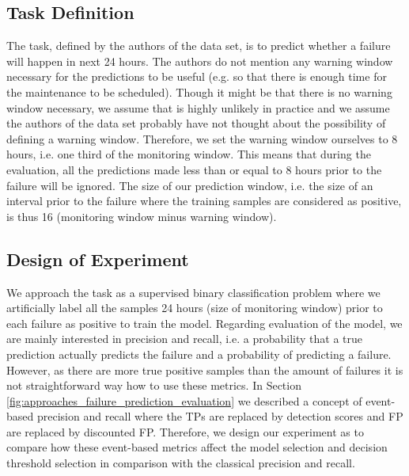 \subsection{Task Definition}

The task, defined by the authors of the data set, is to predict whether a failure will happen in next 24 hours.
The authors do not mention any warning window necessary for the predictions to be useful (e.g. so that there is enough time for the maintenance to be scheduled).
Though it might be that there is no warning window necessary, we assume that is highly unlikely in practice and we assume the authors of the data set probably have not thought about the possibility of defining a warning window.
Therefore, we set the warning window ourselves to 8 hours, i.e. one third of the monitoring window.
This means that during the evaluation, all the predictions made less than or equal to 8 hours prior to the failure will be ignored.
The size of our prediction window, i.e. the size of an interval prior to the failure where the training samples are considered as positive, is thus 16 (monitoring window minus warning window).

\subsection{Design of Experiment}

We approach the task as a supervised binary classification problem where we artificially label all the samples 24 hours (size of monitoring window) prior to each failure as positive to train the model.
Regarding evaluation of the model, we are mainly interested in precision and recall, i.e. a probability that a true prediction actually predicts the failure and a probability of predicting a failure.
However, as there are more true positive samples than the amount of failures it is not straightforward way how to use these metrics.
In Section \ref{fig:approaches_failure_prediction_evaluation} we described a concept of event-based precision and recall where the TPs are replaced by detection scores and FP are replaced by discounted FP.
Therefore, we design our experiment as to compare how these event-based metrics affect the model selection and decision threshold selection in comparison with the classical precision and recall.

